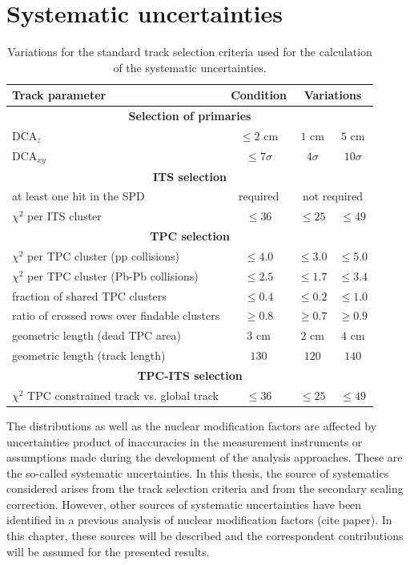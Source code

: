 \documentclass[12pt,a4paper]{report}
\begin{document}
\section{Systematic uncertainties}
\begin{table}[tb!]
\renewcommand{\arraystretch}{1.5}
\centering
\begin{tabular}{l c c c}
\toprule
\rowcolor{headerBlue}  \textbf{Track parameter} &  \textbf{Condition}  &  \multicolumn{2}{c}{\textbf{Variations}} \\
\midrule
\multicolumn{4}{c}{\textbf{Selection of primaries}} \\
\midrule
$\text{DCA}_{z}$ & $\leq 2 $ cm & $1$ cm & $5$ cm\\
$\text{DCA}_{xy}$ & $\leq 7\sigma$ & $4\sigma$ & $10\sigma$ \\
\midrule
\multicolumn{4}{c}{\textbf{ITS selection}} \\
\midrule
at least one hit in the SPD & required  & \multicolumn{2}{c}{not required}\\
$\chi^2$ per ITS cluster  & $\leq 36$ & $\leq 25$ & $\leq 49$ \\
\midrule
\multicolumn{4}{c}{\textbf{TPC selection}} \\
\midrule
$\chi^2$ per TPC cluster (pp collisions) & $\leq 4.0$  & $\leq 3.0$ & $\leq 5.0$\\
$\chi^2$ per TPC cluster (Pb-Pb collisions) & $\leq 2.5$ & $\leq 1.7$ & $\leq 3.4$\\
fraction of shared  TPC clusters&  $\leq 0.4$  & $\leq 0.2$ & $\leq 1.0$ \\
ratio of crossed rows over findable clusters  & $\geq 0.8$ & $\geq 0.7$ & $\geq 0.9$\\
geometric length (dead TPC area) & $3$ cm & $2$ cm & $4$ cm \\
geometric length (track length) & $130$ & $120$  & $140$ \\

\midrule
\multicolumn{4}{c}{\textbf{TPC-ITS selection}} \\
\midrule
$\chi^2$ TPC constrained track vs. global track  & $\leq 36$ & $\leq 25$ & $\leq 49$ \\
\bottomrule
\end{tabular}
\caption{Variations for the standard track selection criteria used for the calculation of the systematic uncertainties.}
\label{tab:curVar}
\end{table}
The \pt distributions as well as the nuclear modification factors are affected by uncertainties product of inaccuracies in the measurement instruments or assumptions made during the development of the analysis approaches. These are the so-called systematic uncertainties. In this thesis, the source of systematics considered arises from the track selection criteria and from the secondary scaling correction. However, other sources of systematic uncertainties have been identified in a previous analysis of nuclear modification factors (cite paper). In this chapter, these sources will be described and the correspondent contributions will be assumed for the presented results.\\
\end{document}
